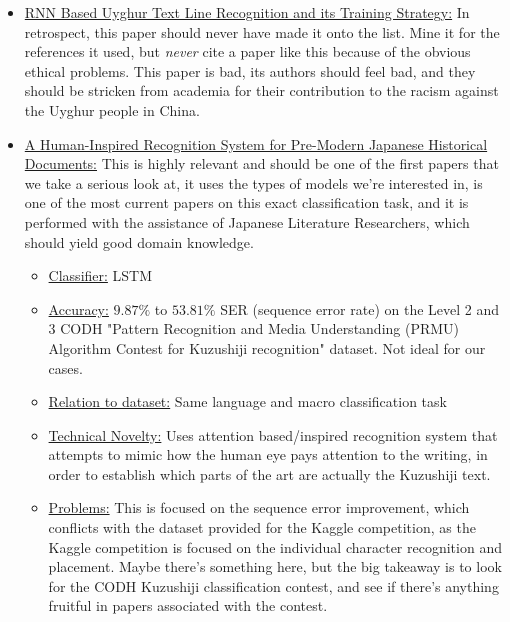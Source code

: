 \documentclass[11pt]{article}
\begin{document}
\begin{itemize}
    \item \underline{RNN Based Uyghur Text Line Recognition and its Training Strategy:} In retrospect, this paper
        should never have made it onto the list. Mine it for the references it used, but \textit{never} cite a paper
        like this because of the obvious ethical problems. This paper is bad, its authors should feel bad, and they
        should be stricken from academia for their contribution to the racism against the Uyghur people in China.
    \item \underline{A Human-Inspired Recognition System for Pre-Modern Japanese Historical Documents:} This is
        highly relevant and should be one of the first papers that we take a serious look at, it uses the types of
        models we're interested in, is one of the most current papers on this exact classification task, and it is
        performed with the assistance of Japanese Literature Researchers, which should yield good domain knowledge.
        \begin{itemize}
            \item \underline{Classifier:} LSTM
            \item \underline{Accuracy:} $9.87\%$ to $53.81\%$ SER (sequence error rate)
                on the Level 2 and 3 CODH "Pattern Recognition and Media Understanding (PRMU) Algorithm Contest for
                Kuzushiji recognition" dataset. Not ideal for our cases.
            \item \underline{Relation to dataset:} Same language and macro classification task
            \item \underline{Technical Novelty:} Uses attention based/inspired recognition system that
                attempts to mimic how the human eye pays attention to the writing, in order to establish
                which parts of the art are actually the Kuzushiji text.
            \item \underline{Problems:} This is focused on the sequence error improvement, which conflicts
                with the dataset provided for the Kaggle competition, as the Kaggle competition is focused on the
                individual character recognition and placement. Maybe there's something here, but the big
                takeaway is to look for the CODH Kuzushiji classification contest, and see if there's anything
                fruitful in papers associated with the contest.
        \end{itemize}
\end{itemize}
\end{document}
